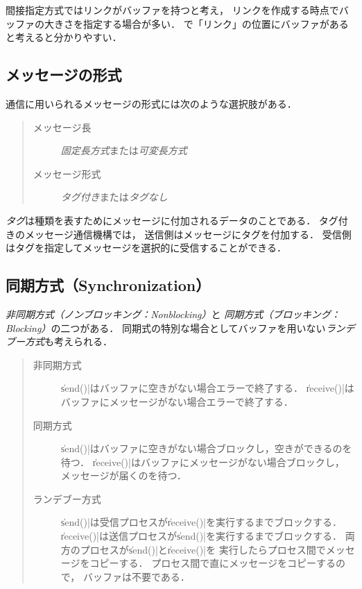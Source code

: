 間接指定方式ではリンクがバッファを持つと考え，
リンクを作成する時点でバッファの大きさを指定する場合が多い．
で「リンク」の位置にバッファがあると考えると分かりやすい．

\subsection{メッセージの形式}
通信に用いられるメッセージの形式には次のような選択肢がある．

\begin{quote}
  \begin{description}
  \item [メッセージ長] \emph{固定長方式}または\emph{可変長方式}
  \item [メッセージ形式] \emph{タグ付き}または\emph{タグなし}
  \end{description}
\end{quote}

\emph{タグ}は種類を表すためにメッセージに付加されるデータのことである．
タグ付きのメッセージ通信機構では，
送信側はメッセージにタグを付加する．
受信側はタグを指定してメッセージを選択的に受信することができる．

\subsection{同期方式（Synchronization）}
\emph{非同期方式（ノンブロッキング：Nonblocking）}と
\emph{同期方式（ブロッキング：Blocking）}の二つがある．
同期式の特別な場合としてバッファを用いない\emph{ランデブー方式}も考えられる．

\begin{quote}
  \begin{description}
  \item [非同期方式]
    \|send()|はバッファに空きがない場合エラーで終了する．
    \|receive()|はバッファにメッセージがない場合エラーで終了する．
  \item [同期方式]
    \|send()|はバッファに空きがない場合ブロックし，空きができるのを待つ．
    \|receive()|はバッファにメッセージがない場合ブロックし，
    メッセージが届くのを待つ．
  \item [ランデブー方式]
    \|send()|は受信プロセスが\|receive()|を実行するまでブロックする．
    \|receive()|は送信プロセスが\|send()|を実行するまでブロックする．
    両方のプロセスが\|send()|と\|receive()|を
    実行したらプロセス間でメッセージをコピーする．
    プロセス間で直にメッセージをコピーするので，
    バッファは不要である．
  \end{description}
\end{quote}

